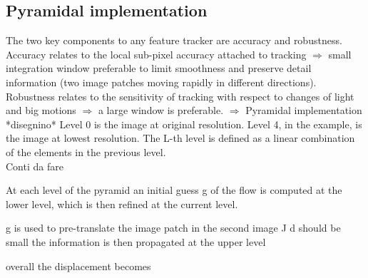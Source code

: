 \subsection{Pyramidal implementation}
The two key components to any feature tracker are accuracy and robustness.
Accuracy relates to the local sub-pixel accuracy attached to tracking $\Rightarrow$ small integration window preferable to limit
smoothness and preserve detail information (two image
patches moving rapidly in different directions).
Robustness relates to the sensitivity of tracking with respect to changes of light and big motions $\Rightarrow$ a large window is preferable.
$\Rightarrow$ Pyramidal implementation  *disegnino*
Level 0 is the image at original resolution.
Level 4, in the example, is the image at lowest resolution.
The L-th level is defined as a linear combination of the elements in the previous level.
\\ Conti da fare 

At each level of the pyramid an initial guess g of the flow is
computed at the lower level, which is then refined at the current
level.

g is used to pre-translate the image patch in the second image J
d should be small
the information is then propagated at the upper level

overall the displacement becomes


